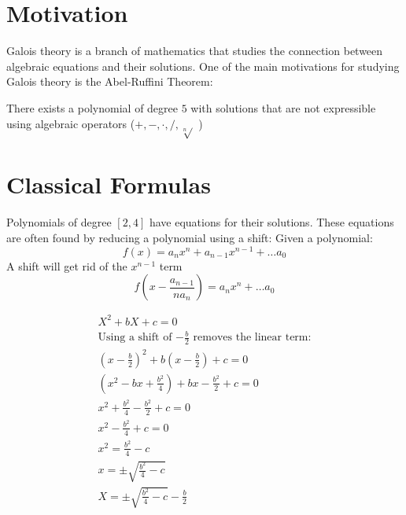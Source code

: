 
\section{Motivation}

Galois theory is a branch of mathematics that studies the connection between algebraic equations and their solutions. One of the main motivations for studying Galois theory is the Abel-Ruffini Theorem:

\begin{theorem}
	\label{thm:abel-rufin}
	There exists a polynomial of degree \(5\) with solutions that are not expressible using algebraic operators (\(+, - , \cdot, /, \sqrt[n]{}\) )
\end{theorem}

\section{Classical Formulas}

Polynomials of degree \([2,4]\) have equations for their solutions.
These equations are often found by reducing a polynomial using a shift:
Given a polynomial: 
\[
	f(x) = a_{n}x^{n} + a_{n-1}x^{n-1} + \ldots a_0  
\] A shift will get rid of the \(x^{n-1}\) term
\[
	f(x - \frac{a_{n-1} }{na_n}) = a_{n}x^{n} + \ldots a_0 
\]
\begin{example}
	\label{ex:quadratic formula}
	\begin{eqnarray*}
		X^2 + bX +c = 0 \\
		\text{Using a shift of \(-\frac{b}{2}\) removes the linear term:} \\
		(x-\frac{b}{2})^2 + b(x - \frac{b}{2}) + c = 0 \\
		(x^2-bx+\frac{b^2}{4}) + bx - \frac{b^2}{2} + c = 0 \\
		x^2+\frac{b^2}{4} - \frac{b^2}{2} + c = 0 \\
		x^2-\frac{b^2}{4} + c = 0 \\
		x^2= \frac{b^2}{4} - c \\
		x = \pm \sqrt{\frac{b^2}{4} - c} \\
		X = \pm \sqrt{\frac{b^2}{4} - c} - \frac{b}{2} \\
	\end{eqnarray*}
\end{example}





